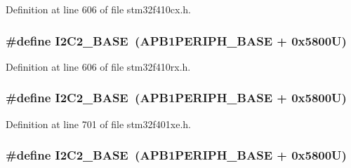 Definition at line 606 of file stm32f410cx.\+h.

\subsubsection[{\texorpdfstring{I2\+C2\+\_\+\+B\+A\+SE}{I2C2_BASE}}]{\setlength{\rightskip}{0pt plus 5cm}\#define I2\+C2\+\_\+\+B\+A\+SE~({\bf A\+P\+B1\+P\+E\+R\+I\+P\+H\+\_\+\+B\+A\+SE} + 0x5800\+U)}\hypertarget{group___peripheral__registers__structures_ga04bda70f25c795fb79f163b633ad4a5d}{}\label{group___peripheral__registers__structures_ga04bda70f25c795fb79f163b633ad4a5d}


Definition at line 606 of file stm32f410rx.\+h.

\subsubsection[{\texorpdfstring{I2\+C2\+\_\+\+B\+A\+SE}{I2C2_BASE}}]{\setlength{\rightskip}{0pt plus 5cm}\#define I2\+C2\+\_\+\+B\+A\+SE~({\bf A\+P\+B1\+P\+E\+R\+I\+P\+H\+\_\+\+B\+A\+SE} + 0x5800\+U)}\hypertarget{group___peripheral__registers__structures_ga04bda70f25c795fb79f163b633ad4a5d}{}\label{group___peripheral__registers__structures_ga04bda70f25c795fb79f163b633ad4a5d}


Definition at line 701 of file stm32f401xe.\+h.

\subsubsection[{\texorpdfstring{I2\+C2\+\_\+\+B\+A\+SE}{I2C2_BASE}}]{\setlength{\rightskip}{0pt plus 5cm}\#define I2\+C2\+\_\+\+B\+A\+SE~({\bf A\+P\+B1\+P\+E\+R\+I\+P\+H\+\_\+\+B\+A\+SE} + 0x5800\+U)}\hypertarget{group___peripheral__registers__structures_ga04bda70f25c795fb79f163b633ad4a5d}{}\label{group___peripheral__registers__structures_ga04bda70f25c795fb79f163b633ad4a5d}


